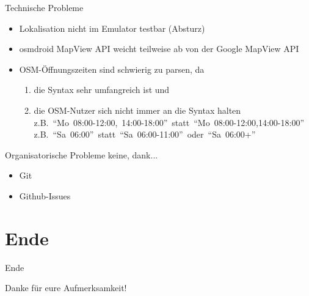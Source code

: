 \documentclass[hyperref]{beamer}
\begin{document}
\begin{frame}{Technische Probleme}
	\begin{itemize}
		\item Lokalisation nicht im Emulator testbar (Absturz)
        \item osmdroid MapView API weicht teilweise ab von der Google MapView API
		\item OSM-Öffnungszeiten sind schwierig zu parsen, da
		\begin{enumerate}
		  \item die Syntax sehr umfangreich ist und
		  \item die OSM-Nutzer sich nicht immer an die Syntax halten\\
		  \vspace*{0.1cm}
		  \mbox{z.B. ``Mo 08:00-12:00, 14:00-18:00'' statt ``Mo 08:00-12:00,14:00-18:00''}\\
		  \mbox{z.B. ``Sa 06:00'' statt ``Sa 06:00-11:00'' oder ``Sa 06:00+''}
		\end{enumerate}

	\end{itemize}
\end{frame}


\begin{frame}{Organisatorische Probleme}
	keine, dank...
	\begin{itemize}
		\item Git
		\item Github-Issues
	\end{itemize}
\end{frame}

\section{Ende}
\begin{frame}{Ende}
	\begin{center}
		Danke für eure Aufmerksamkeit!
	\end{center}
\end{frame}
\end{document}
